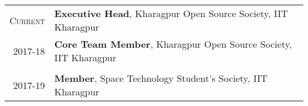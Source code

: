 \documentclass[a4paper,12pt]{extarticle} %
\let\oldtextbf\textbf
\renewcommand{\textbf}[1]{\textcolor{bold}{\oldtextbf{#1}}}
\begin{document}
\begin{tabular}{r|p{16cm}}
  \textsc{Current} & \textbf{Executive Head}, Kharagpur Open Source Society, IIT Kharagpur \\
  \textsc{2017-18} & \textbf{Core Team Member}, Kharagpur Open Source Society, IIT Kharagpur \\
  \multicolumn{2}{c}{} \\


\textsc{2017-19} & \textbf{Member}, Space Technology Student's Society, IIT Kharagpur \\
\end{tabular}



\end{document}
